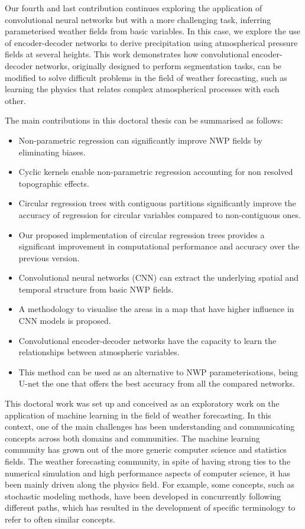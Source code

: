 \medskip

Our fourth and last contribution continues exploring the application of convolutional neural networks but with a more challenging task, inferring parameterised weather fields from basic variables. In this case, we explore the use of encoder-decoder networks to derive precipitation using atmospherical pressure fields at several heights. This work demonstrates how convolutional encoder-decoder networks, originally designed to perform segmentation tasks, can be modified to solve difficult problems in the field of weather forecasting, such as learning the physics that relates complex atmospherical processes with each other.

\bigskip
\bigskip
\bigskip

The main contributions in this doctoral thesis can be summarised as follows:

\begin{itemize}
  \item Non-parametric regression can significantly improve NWP fields by eliminating biases.
  \item Cyclic kernels enable non-parametric regression accounting for non resolved topographic effects.
  \item Circular regression trees with contiguous partitions significantly improve the accuracy of regression for circular variables compared to non-contiguous ones.
  \item Our proposed implementation of circular regression trees provides a significant improvement in computational performance and accuracy over the previous version.
  \item Convolutional neural networks (CNN) can extract the underlying spatial and temporal structure from basic NWP fields.
  \item A methodology to visualise the areas in a map that have higher influence in CNN models is proposed.
  \item Convolutional encoder-decoder networks have the capacity to learn the relationships between atmospheric variables. 
  \item This method can be used as an alternative to NWP parameterisations, being U-net the one that offers the best accuracy from all the compared networks.
\end{itemize}

\medskip

This doctoral work was set up and conceived as an exploratory work on the application of machine learning in the field of weather forecasting. In this context, one of the main challenges has been understanding and communicating concepts across both domains and communities. The machine learning community has grown out of the more generic computer science and statistics fields. The weather forecasting community, in spite of having strong ties to the numerical simulation and high performance aspects of computer science, it has been mainly driven along the physics field. For example, some concepts, such as stochastic modeling methods, have been developed in concurrently following different paths, which has resulted in the development of specific terminology to refer to often similar concepts.

